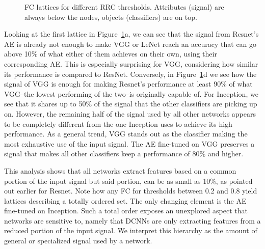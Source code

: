 \documentclass[10pt,twocolumn,a4paper]{article}
\begin{document}
\begin{figure}
	\footnotesize
	\hfill
	\subfloat[$t=0.1$]{}
	\hfill
	\subfloat[$t=0.2$]{}
	\hfill
	\subfloat[$t=0.8$]{}
	\hfill
	\subfloat[$t=0.9$]{}
	\hfill
	\caption{FC lattices for different RRC thresholds. Attributes (signal) are always below the nodes, objects (classifiers) are on top.}
	\label{fig:lattices}
\end{figure}

Looking at the first lattice in Figure~\ref{fig:lattices}a, we can see that the signal from Resnet's AE is already not enough to make VGG or LeNet reach an accuracy that can go above 10\% of what either of them achieves on their own, using their corresponding AE.
This is especially surprising for VGG, considering how similar its performance is compared to ResNet.
Conversely, in Figure~\ref{fig:lattices}d we see how the signal of VGG is enough for making Resnet's performance at least 90\% of what VGG--the lowest performing of the two--is originally capable of.
For Inception, we see that it shares up to 50\% of the signal that the other classifiers are picking up on.
However, the remaining half of the signal used by all other networks appears to be completely different from the one Inception uses to achieve its high performance.
As a general trend, VGG stands out as the classifier making the most exhaustive use of the input signal.
The AE fine-tuned on VGG preserves a signal that makes all other classifiers keep a performance of 80\% and higher.

This analysis shows that all networks extract features based on a common portion of the input signal but said portion, can be as small as 10\%, as pointed out earlier for Resnet.
Note how any FC for thresholds between 0.2 and 0.8 yield lattices describing a totally ordered set.
The only changing element is the AE fine-tuned on Inception.
Such a total order exposes an unexplored aspect that networks are sensitive to, namely that DCNNs are only extracting features from a reduced portion of the input signal.
We interpret this hierarchy as the amount of general or specialized signal used by a network.
\end{document}

